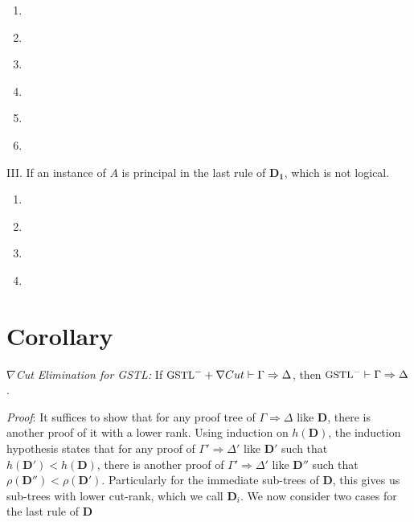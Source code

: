 \begin{enumerate}
\begin{enumerate}[label={\alph*.}]
	\begin{enumerate}[label={\Alph*.}]
		\item \label{c:ra-la1} 

		\item \label{c:ra-la2} 

		\item \label{c:ro1-lo} 

		\item \label{c:ro2-lo} 

		\item \label{c:rn-*} 

		\item \label{c:ri-li} 

	\end{enumerate}

	III. If an instance of $A$ is principal in the last rule of $\mathbf{D_1}$, which is not logical.
	\begin{enumerate}[label={\roman*.}]
		\item \label{c:*-id} 

		\item \label{c:*-ex} 

		\item \label{c:*-lw-p} 
	
		\item \label{c:*-lc-p} 
	\end{enumerate}
\end{enumerate}

\section{Corollary} \emph{$\nabla$Cut Elimination for GSTL: }
If $\small\text{GSTL}^- + \nabla Cut \vdash \Gamma \Rightarrow \Delta$, then $\small\text{GSTL}^- \vdash \Gamma \Rightarrow \Delta$.

\textit{Proof}: It suffices to show that for any proof tree of $\Gamma \Rightarrow \Delta$ like $\mathbf{D}$, there is another proof of it with a lower rank. Using induction on $h(\mathbf{D})$, the induction hypothesis states that for any proof of $\Gamma' \Rightarrow \Delta'$ like $\mathbf{D'}$ such that $h(\mathbf{D'}) < h(\mathbf{D})$, there is another proof of $\Gamma' \Rightarrow \Delta'$ like $\mathbf{D''}$ such that $\rho(\mathbf{D''}) < \rho(\mathbf{D'})$. Particularly for the immediate sub-trees of $\mathbf{D}$, this gives us sub-trees with lower cut-rank, which we call $\mathbf{D}_i$. We now consider two cases for the last rule of $\mathbf{D}$


\end{enumerate}
